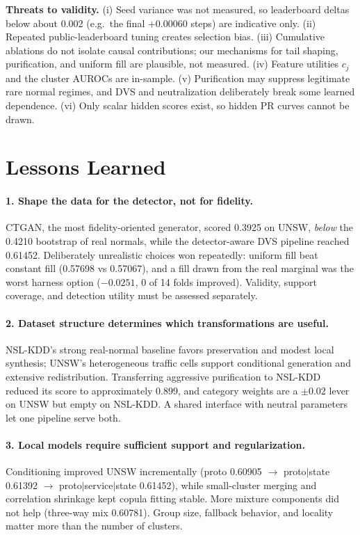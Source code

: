 \documentclass[10pt,a4paper]{article}
\begin{document}
\textbf{Threats to validity.} (i) Seed variance was not measured, so leaderboard deltas below about 0.002 (e.g.\ the final +0.00060 steps) are indicative only. (ii) Repeated public-leaderboard tuning creates selection bias. (iii) Cumulative ablations do not isolate causal contributions; our mechanisms for tail shaping, purification, and uniform fill are plausible, not measured. (iv) Feature utilities $c_j$ and the cluster AUROCs are in-sample. (v) Purification may suppress legitimate rare normal regimes, and DVS and neutralization deliberately break some learned dependence. (vi) Only scalar hidden scores exist, so hidden PR curves cannot be drawn.

\section{Lessons Learned}\label{sec:lessons}
\paragraph{1. Shape the data for the detector, not for fidelity.}
CTGAN, the most fidelity-oriented generator, scored 0.3925 on UNSW, \emph{below} the 0.4210 bootstrap of real normals, while the detector-aware DVS pipeline reached 0.61452. Deliberately unrealistic choices won repeatedly: uniform fill beat constant fill (0.57698 vs 0.57067), and a fill drawn from the real marginal was the worst harness option ($-0.0251$, 0 of 14 folds improved). Validity, support coverage, and detection utility must be assessed separately.

\paragraph{2. Dataset structure determines which transformations are useful.}
NSL-KDD's strong real-normal baseline favors preservation and modest local synthesis; UNSW's heterogeneous traffic cells support conditional generation and extensive redistribution. Transferring aggressive purification to NSL-KDD reduced its score to approximately 0.899, and category weights are a $\pm0.02$ lever on UNSW but empty on NSL-KDD. A shared interface with neutral parameters let one pipeline serve both.

\paragraph{3. Local models require sufficient support and regularization.}
Conditioning improved UNSW incrementally (proto 0.60905 $\to$ proto$|$state 0.61392 $\to$ proto$|$service$|$state 0.61452), while small-cluster merging and correlation shrinkage kept copula fitting stable. More mixture components did not help (three-way mix 0.60781). Group size, fallback behavior, and locality matter more than the number of clusters.
\end{document}
